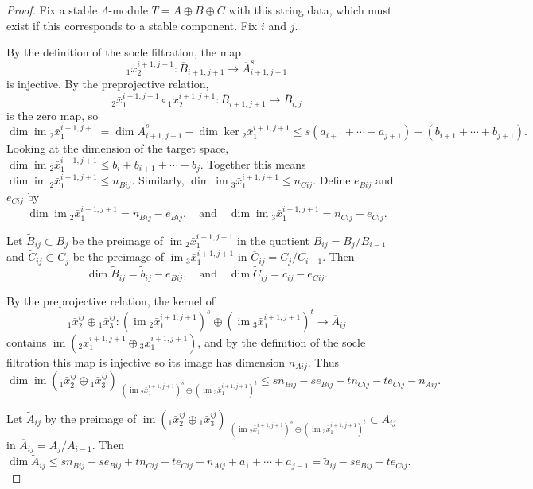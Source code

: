 \documentclass{amsart}
\numberwithin{equation}{section}
\numberwithin{figure}{section}
\numberwithin{table}{section}
\theoremstyle{definition}
\newcommand{\im}{\operatorname{im}}
\begin{document}
\begin{proof}
Fix a stable $\Lambda$-module $T=A\oplus B \oplus C$ with this string data, which must exist if this corresponds to a stable component. Fix $i$ and $j$. 

By the definition of the socle filtration, the map
$${}_1x^{i+1,j+1}_2 :  \overline B_{i+1,j+1}  \rightarrow \overline A_{i+1,j+1}^s$$
is injective. By the preprojective relation,
$$ {}_2 \bar x^{i+1,j+1}_1 \circ {}_1x^{i+1,j+1}_2 :  \overline B_{i+1,j+1} \rightarrow  \overline B_{i,j}$$
is the zero map, 
so 
$$\dim \im  {}_2 \bar x^{i+1,j+1}_1 = \dim \overline A_{i+1,j+1}^s - \dim \ker {}_2 \bar x^{i+1,j+1}_1  \leq s(a_{i+1}+\cdots+a_{j+1})-(b_{i+1}+\cdots+b_{j+1}).$$
Looking at the dimension of the target space, $\dim \im  {}_2 \bar x^{i+1,j+1}_1 \leq b_i+b_{i+1}+\cdots+b_{j}$. Together this means $\dim \im  {}_2 \bar x^{i+1,j+1}_1 \leq n_{Bij}$. Similarly, 
$\dim \im  {}_3 \bar x^{i+1,j+1}_1 \leq n_{Cij}.$ Define $e_{Bij}$ and $e_{Cij}$ by
$$
\dim  \im  {}_2 \bar x^{i+1,j+1}_1 =  n_{Bij} - e_{Bij}, \quad \text{and} \quad \dim \im  {}_3 \bar x^{i+1,j+1}_1  = n_{Cij} - e_{Cij}.
$$

Let $\tilde B_{ij} \subset B_j$ be the preimage of $\im  {}_2 \bar x^{i+1,j+1}_1$ in the quotient $\overline B_{ij}= B_j/B_{i-1}$ and $\tilde C_{ij} \subset C_j$ be the preimage of $\im  {}_3 \bar x^{i+1,j+1}_1$ in $\overline C_{ij}= C_j/C_{i-1}.$ Then
$$
\dim \tilde B_{ij} = \tilde b_{ij} - e_{Bij}, \quad \text{and} \quad \dim \tilde C_{ij} = \tilde c_{ij} - e_{Cij}.
$$

By the preprojective relation, the kernel of
$${}_1 \bar x^{ij}_2 \oplus {}_1 \bar x^{ij}_3 : (\im  {}_2 \bar x^{i+1,j+1}_1)^s \oplus (\im  {}_3 \bar x^{i+1,j+1}_1)^t \rightarrow \overline A_{ij}$$
contains $\im ( {}_2  x^{i+1,j+1}_1 \oplus {}_3 x^{i+1,j+1}_1)$, and by the definition of the socle filtration this map is injective so its image has dimension $n_{Aij}.$ Thus
$$\dim \im ( {}_1 \bar x^{ij}_2 \oplus {}_1 \bar x^{ij}_3 )|_{ (\im  {}_2 \bar x^{i+1,j+1}_1)^s \oplus (\im  {}_3 \bar x^{i+1,j+1}_1)^t }\leq sn_{Bij} - se_{Bij}+t n_{Cij} - te_{Cij} - n_{Aij}.$$

Let $\tilde A_{ij}$ by the preimage of $\im ( {}_1 \bar x^{ij}_2 \oplus {}_1 \bar x^{ij}_3 )|_{ (\im  {}_2 \bar x^{i+1,j+1}_1)^s \oplus (\im  {}_3 \bar x^{i+1,j+1}_1)^t } \subset  \overline A_{ij}$ in $\overline A_{ij}= A_j/A_{i-1}$. Then 
$$\dim \tilde A_{ij} \leq  sn_{Bij} - se_{Bij}+t n_{Cij} - te_{Cij} - n_{Aij} + a_1+ \cdots + a_{j-1}= \tilde a_{ij} - se_{Bij} - te_{Cij}.$$ 


\end{proof}
\end{document}
